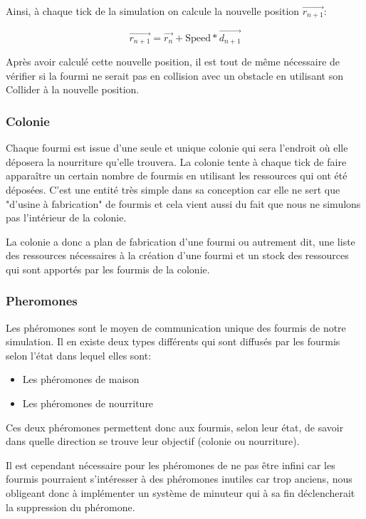 \documentclass{EPUProjetDi}
\begin{document}
Ainsi, à chaque tick de la simulation on calcule la nouvelle position $\vec{r_{n+1}}$:

\begin{equation}
    \vec{r_{n+1}} = \vec{r_{n}} + \text{Speed} * \vec{d_{n+1}}
\end{equation}

Après avoir calculé cette nouvelle position, il est tout de même nécessaire de vérifier si la fourmi ne serait pas en collision avec un obstacle en
utilisant son Collider à la nouvelle position. 

\subsubsection{Colonie}

Chaque fourmi est issue d'une seule et unique colonie qui sera l'endroit où elle déposera la nourriture qu'elle trouvera. La colonie tente à chaque tick de
faire apparaître un certain nombre de fourmis en utilisant les ressources qui ont été déposées. C'est une entité très simple dans sa conception car elle
ne sert que "d'usine à fabrication" de fourmis et cela vient aussi du fait que nous ne simulons pas l'intérieur de la colonie.

La colonie a donc a plan de fabrication d'une fourmi ou autrement dit, une liste des ressources nécessaires à la création d'une fourmi et un stock
des ressources qui sont apportés par les fourmis de la colonie.

\subsubsection{Pheromones}

Les phéromones sont le moyen de communication unique des fourmis de notre simulation. Il en existe deux types différents qui sont diffusés par
les fourmis selon l'état dans lequel elles sont:
\begin{itemize}
    \item Les phéromones de maison
    \item Les phéromones de nourriture
\end{itemize}

Ces deux phéromones permettent donc aux fourmis, selon leur état, de savoir dans quelle direction se trouve leur objectif (colonie ou nourriture).

Il est cependant nécessaire pour les phéromones de ne pas être infini car les fourmis pourraient s'intéresser à des phéromones inutiles car trop anciens, 
nous obligeant donc à implémenter un système de minuteur qui à sa fin déclencherait la suppression du phéromone.
\end{document}
